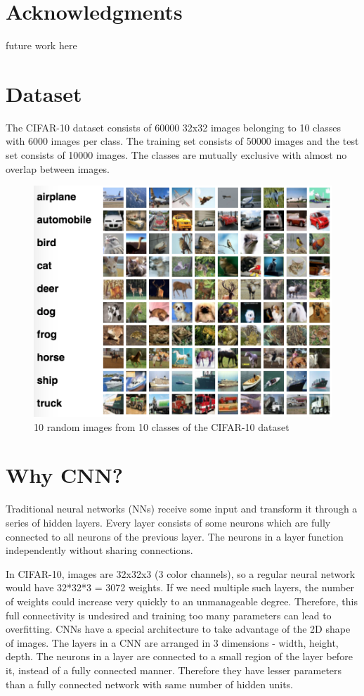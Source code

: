 \documentclass[10pt,twocolumn,letterpaper]{article}
\begin{document}
\section{Acknowledgments} \label{acknowledgments}
future work here

\section{Dataset}
The CIFAR-10 dataset \cite{krizhevsky2009learning} consists of 60000 32x32 images belonging to 10 classes with 6000 images per class.	The training set consists of 50000 images and the test set consists of 10000 images. The classes are mutually exclusive with almost no overlap between images.

\begin{figure}[hbt]
  \includegraphics[scale=0.50]{cifar-dataset}
  \caption{10 random images from 10 classes of the CIFAR-10 dataset}
\end{figure}

\section{Why CNN?}
Traditional neural networks (NNs) receive some input and transform it through a series of hidden layers. Every layer consists of some neurons which are fully connected to all neurons of the previous layer. The neurons in a layer function independently without sharing connections.

In CIFAR-10, images are 32x32x3 (3 color channels), so a regular neural network would have 32*32*3 = 3072 weights. If we need multiple such layers, the number of weights could increase very quickly to an unmanageable degree. Therefore, this full connectivity is undesired and training too many parameters can lead to overfitting. CNNs have a special architecture to take advantage of the 2D shape of images. The layers in a CNN are arranged in 3 dimensions - width, height, depth. The neurons in a layer are connected to a small region of the layer before it, instead of a fully connected manner. Therefore they have lesser parameters than a fully connected network with same number of hidden units.
\end{document}
